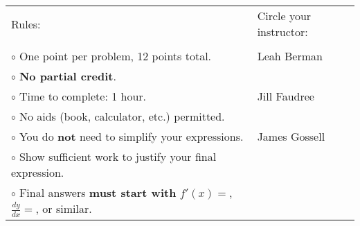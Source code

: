 \documentclass[12pt]{article}
\begin{document}
\begin{tabular}{m{12cm} m{5cm}}
{\large{Rules:}} & {\large{Circle your instructor:}}\\
&\\

$\circ$ One point per problem, 12 points total. & Leah Berman\\

$\circ$  {\bf No partial credit}. & \\

$\circ$ Time to complete: 1 hour. & Jill Faudree\\

$\circ$ No aids (book, calculator, etc.) permitted.  &\\

$\circ$ You do \textbf{not} need to simplify your expressions.&James Gossell\\

$\circ$ Show sufficient work to justify your final expression. &\\

$\circ$ Final answers \textbf{must start with} $f'(x)=$, $\frac{dy}{dx}=$, or similar.&\\

\end{tabular}

\vspace{.2in}
\end{document}

